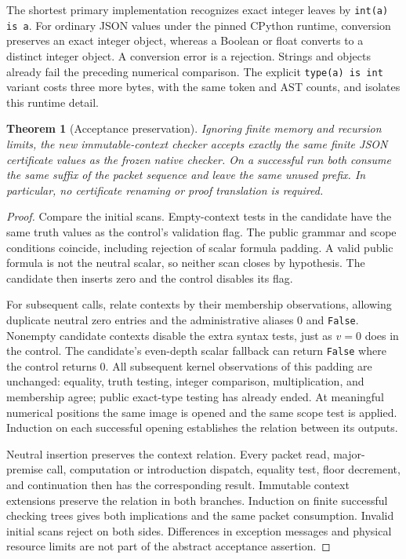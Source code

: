\documentclass[11pt,a4paper]{article}
\newtheorem{theorem}{Theorem}[section]
\theoremstyle{definition}\newtheorem{definition}[theorem]{Definition}
\theoremstyle{remark}\newtheorem{remark}[theorem]{Remark}
\begin{document}
The shortest primary implementation recognizes exact integer leaves by
\texttt{int(a) is a}. For ordinary JSON values under the pinned CPython
runtime, conversion preserves an exact integer object, whereas a Boolean
or float converts to a distinct integer object. A conversion error is a
rejection. Strings and objects already fail the preceding numerical
comparison. The explicit \texttt{type(a) is int} variant costs three more
bytes, with the same token and AST counts, and isolates this runtime detail.

\begin{theorem}[Acceptance preservation]
\label{thm:checker-equivalence}
Ignoring finite memory and recursion limits, the new immutable-context
checker accepts exactly the same finite JSON certificate values as the
frozen native checker. On a successful run both consume the same suffix
of the packet sequence and leave the same unused prefix. In particular,
no certificate renaming or proof translation is required.
\end{theorem}
\begin{proof}
Compare the initial scans. Empty-context tests in the candidate have the
same truth values as the control's validation flag. The public grammar
and scope conditions coincide, including rejection of scalar formula
padding. A valid public formula is not the neutral scalar, so neither
scan closes by hypothesis. The candidate then inserts zero and the
control disables its flag.

For subsequent calls, relate contexts by their membership observations,
allowing duplicate neutral zero entries and the administrative aliases
$0$ and \texttt{False}. Nonempty candidate contexts disable the extra
syntax tests, just as $v=0$ does in the control. The candidate's
even-depth scalar fallback can return \texttt{False} where the control
returns $0$. All subsequent kernel observations of this padding are
unchanged: equality, truth testing, integer comparison, multiplication,
and membership agree; public exact-type testing has already ended.
At meaningful numerical positions the same image is opened and the same
scope test is applied. Induction on each successful opening establishes
the relation between its outputs.

Neutral insertion preserves the context relation. Every packet read,
major-premise call, computation or introduction dispatch, equality test,
floor decrement, and continuation then has the corresponding result.
Immutable context extensions preserve the relation in both branches.
Induction on finite successful checking trees gives both implications
and the same packet consumption. Invalid initial scans reject on both
sides. Differences in exception messages and physical resource limits
are not part of the abstract acceptance assertion.
\end{proof}
\end{document}
